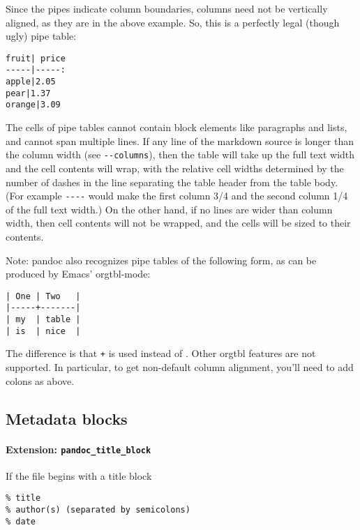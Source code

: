 \documentclass[
]{article}
\begin{document}
Since the pipes indicate column boundaries, columns need not be
vertically aligned, as they are in the above example. So, this is a
perfectly legal (though ugly) pipe table:

\begin{verbatim}
fruit| price
-----|-----:
apple|2.05
pear|1.37
orange|3.09
\end{verbatim}

The cells of pipe tables cannot contain block elements like paragraphs
and lists, and cannot span multiple lines. If any line of the markdown
source is longer than the column width (see \texttt{-\/-columns}), then
the table will take up the full text width and the cell contents will
wrap, with the relative cell widths determined by the number of dashes
in the line separating the table header from the table body. (For
example \texttt{-\/-\/-\textbar{}-} would make the first column 3/4 and
the second column 1/4 of the full text width.) On the other hand, if no
lines are wider than column width, then cell contents will not be
wrapped, and the cells will be sized to their contents.

Note: pandoc also recognizes pipe tables of the following form, as can
be produced by Emacs' orgtbl-mode:

\begin{verbatim}
| One | Two   |
|-----+-------|
| my  | table |
| is  | nice  |
\end{verbatim}

The difference is that \texttt{+} is used instead of
\texttt{\textbar{}}. Other orgtbl features are not supported. In
particular, to get non-default column alignment, you'll need to add
colons as above.

\hypertarget{metadata-blocks}{%
\subsection{Metadata blocks}\label{metadata-blocks}}

\hypertarget{extension-pandoc_title_block}{%
\paragraph{\texorpdfstring{Extension:
\texttt{pandoc\_title\_block}}{Extension: pandoc\_title\_block}}\label{extension-pandoc_title_block}}

If the file begins with a title block

\begin{verbatim}
% title
% author(s) (separated by semicolons)
% date
\end{verbatim}
\end{document}

